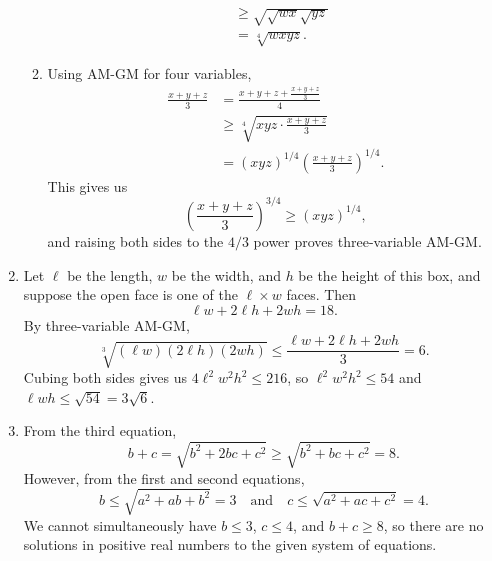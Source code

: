 \begin{enumerate}
\begin{enumerate}
\begin{align*}
&\geq\sqrt{\sqrt{wx}\sqrt{yz}} \\
&= \sqrt[4]{wxyz}.
\end{align*}
\item Using AM-GM for four variables,
\begin{align*} 
\frac{x + y + z}{3} &= \frac{x + y + z + \frac{x + y + z}{3}}{4} \\
&\geq\sqrt[4]{xyz\cdot\frac{x + y + z}{3}} \\
&= (xyz)^{1/4}\left(\frac{x + y + z}{3}\right)^{1/4}.
\end{align*}
This gives us
\begin{equation*}
\left(\frac{x + y + z}{3}\right)^{3/4}\geq (xyz)^{1/4},
\end{equation*}
and raising both sides to the $4/3$ power proves three-variable AM-GM.
\end{enumerate}
\item Let $\ell$ be the length, $w$ be the width, and $h$ be the height of this box, and suppose the open face is one of the $\ell\times w$ faces. Then 
\begin{equation*}
\ell w + 2\ell h + 2wh = 18.
\end{equation*}
By three-variable AM-GM,
\begin{equation*}
\sqrt[3]{(\ell w)(2\ell h)(2wh)}\leq\frac{\ell w + 2\ell h + 2wh}{3} = 6.
\end{equation*}
Cubing both sides gives us $4\ell^2 w^2h^2\leq 216$, so $\ell^2 w^2h^2\leq 54$ and $\ell wh\leq\sqrt{54} = \boxed{3\sqrt{6}}$.
\item From the third equation,
\begin{equation*}
b + c = \sqrt{b^2 + 2bc + c^2}\geq\sqrt{b^2 + bc + c^2} = 8.
\end{equation*}
However, from the first and second equations,
\begin{equation*}
b\leq\sqrt{a^2 + ab + b^2} = 3\quad\text{and}\quad c\leq\sqrt{a^2 + ac + c^2} = 4.
\end{equation*}
We cannot simultaneously have $b\leq 3$, $c\leq 4$, and $b + c\geq 8$, so there are no solutions in positive real numbers to the given system of equations.
\end{enumerate}